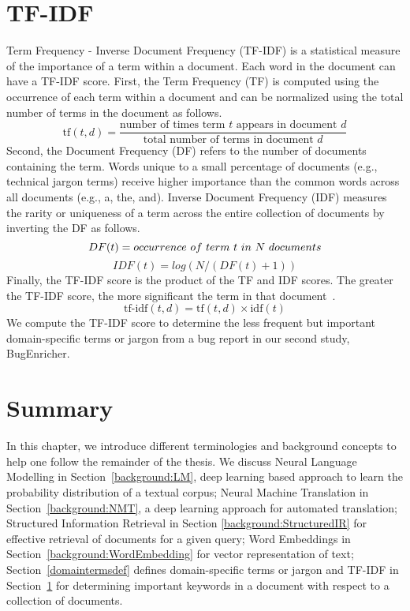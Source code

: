 \section{TF-IDF}\label{background:TF-IDF}
Term Frequency - Inverse Document Frequency (TF-IDF) is a statistical measure of the importance of a term within a document. Each word in the document can have a \acrshort{TF-IDF} score. First, the Term Frequency (TF) is computed using the occurrence of each term within a document and can be normalized using the total number of terms in the document as follows.
\begin{equation}
\text{tf}(t, d) = \frac{\text{number of times term } t \text{ appears in document } d}{\text{total number of terms in document } d}
\end{equation}
Second, the Document Frequency (DF) refers to the number of documents containing the term. Words unique to a small percentage of documents (e.g., technical jargon terms) receive higher importance than the common words across all documents (e.g., a, the, and). Inverse Document Frequency (IDF) measures the rarity or uniqueness of a term across the entire collection of documents by inverting the DF as follows.
\begin{equation}
{ DF(t) = occurrence\ of\ term\ t\ in\ N\ documents \\}
\end{equation}
\begin{equation}
    IDF(t) = log(N/(DF(t) + 1))
\end{equation}
Finally, the TF-IDF score is the product of the TF and IDF scores. The greater the TF-IDF score, the more significant the term in that document~\cite{tfidf}.
\begin{equation}
\text{tf-idf}(t, d) = \text{tf}(t, d) \times \text{idf}(t)
\end{equation}
We compute the TF-IDF score to determine the less frequent but important domain-specific terms or jargon from a bug report in our second study, BugEnricher.

\section{Summary}
In this chapter, we introduce different terminologies and background concepts to help one follow the remainder of the thesis. We discuss Neural Language Modelling in Section~\ref{background:LM}, deep learning based approach to learn the probability distribution of a textual corpus; Neural Machine Translation in Section~\ref{background:NMT}, a deep learning approach for automated translation; Structured Information Retrieval in Section \ref{background:StructuredIR} for effective retrieval of documents for a given query; Word Embeddings in Section~\ref{background:WordEmbedding} for vector representation of text; Section~\ref{domaintermsdef} defines domain-specific terms or jargon and TF-IDF in Section~\ref{background:TF-IDF} for determining important keywords in a document with respect to a collection of documents.